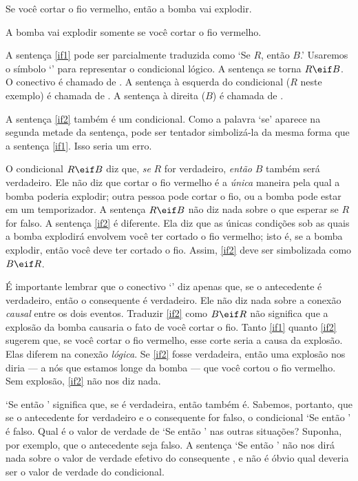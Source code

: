 \begin{earg}
\item[\ex{if1}] Se você cortar o fio vermelho, então a bomba vai explodir.
\item[\ex{if2}] A bomba vai explodir somente se você cortar o fio vermelho.
\end{earg}

A sentença \ref{if1} pode ser parcialmente traduzida como `Se $R$, então $B$.' Usaremos o símbolo `\eif' para representar o condicional lógico. A sentença se torna $R\eif B$. O conectivo é chamado de . A sentença à esquerda do condicional ($R$ neste exemplo) é chamada de . A sentença à direita ($B$) é chamada de .

A sentença \ref{if2} também é um condicional. Como a palavra `se' aparece na segunda metade da sentença, pode ser tentador simbolizá-la da mesma forma que a sentença \ref{if1}. Isso seria um erro.

O condicional $R\eif B$ diz que, \emph{se} $R$ for verdadeiro, \emph{então} $B$ também será verdadeiro. Ele não diz que cortar o fio vermelho é a \emph{única} maneira pela qual a bomba poderia explodir; outra pessoa pode cortar o fio, ou a bomba pode estar em um temporizador. A sentença $R\eif B$ não diz nada sobre o que esperar se $R$ for falso. A sentença \ref{if2} é diferente. Ela diz que as únicas condições sob as quais a bomba explodirá envolvem você ter cortado o fio vermelho; isto é, se a bomba explodir, então você deve ter cortado o fio. Assim, \ref{if2} deve ser simbolizada como $B \eif R$.

É importante lembrar que o conectivo `\eif' diz apenas que, se o antecedente é verdadeiro, então o consequente é verdadeiro. Ele não diz nada sobre a conexão \emph{causal} entre os dois eventos. Traduzir \ref{if2} como $B \eif R$ não significa que a explosão da bomba causaria o fato de você cortar o fio. Tanto \ref{if1} quanto \ref{if2} sugerem que, se você cortar o fio vermelho, esse corte seria a causa da explosão. Elas diferem na conexão \emph{lógica}. Se \ref{if2} fosse verdadeira, então uma explosão nos diria — a nós que estamos longe da bomba — que você cortou o fio vermelho. Sem explosão, \ref{if2} não nos diz nada.


`Se  então ' significa que, se  é verdadeira, então  também é. Sabemos, portanto, que se o antecedente  for verdadeiro e o consequente  for falso, o condicional `Se  então ' é falso. Qual é o valor de verdade de `Se  então ' nas outras situações? Suponha, por exemplo, que o antecedente  seja falso. A sentença `Se  então ' não nos dirá nada sobre o valor de verdade efetivo do consequente , e não é óbvio qual deveria ser o valor de verdade do condicional.

